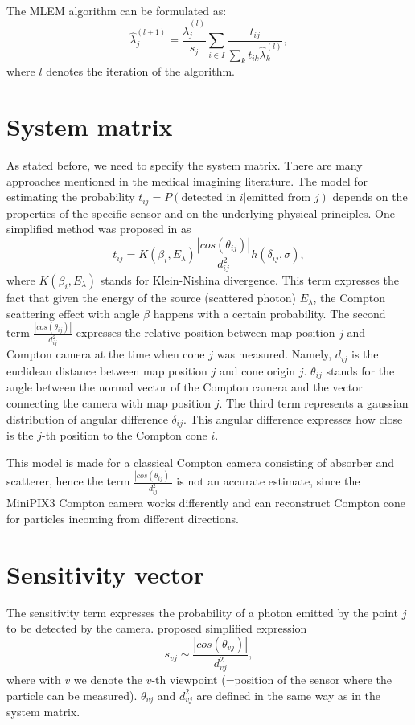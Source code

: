 The \ac{MLEM} algorithm can be formulated as:
\begin{equation}
\hat{\lambda}_{j}^{(l+1)} = \frac{\hat{\lambda}_{j}^{(l)}}{s_{j}} \sum_{i \in I} \frac{t_{ij}}{\sum_{k} t_{ik} \hat{\lambda}_{k}^{(l)}},
  \label{eq:MLEM}
\end{equation}
where $l$ denotes the iteration of the algorithm.

\section{System matrix}
As stated before, we need to specify the system matrix.
There are many approaches mentioned in the medical imagining literature.
The model for estimating the probability $t_{ij} = P(\textrm{detected in } i | \textrm{emitted from } j)$ depends on the properties of the specific sensor and on the underlying physical principles.
One simplified method was proposed in \cite{maxim2016} as
\begin{equation}
  t_{ij} = K(\beta_{i},E_{\lambda})   \frac{\left| cos(\theta_{ij}) \right|}{d^{2}_{ij}} h(\delta_{ij}, \sigma),
\end{equation}
where $K(\beta_{i},E_{\lambda})$ stands for Klein-Nishina divergence. 
This term expresses the fact that given the energy of the source (scattered photon) $E_{\lambda}$, the Compton scattering effect with angle $\beta$ happens with a certain probability. 
The second term  $\frac{\left| cos(\theta_{ij}) \right|}{d^{2}_{ij}}$ expresses the relative position between map position $j$ and Compton camera at the time when cone $j$ was measured.
Namely, $d_{ij}$ is the euclidean distance between map position $j$ and cone origin $j$.
$\theta_{ij}$ stands for the angle between the normal vector of the Compton camera and the vector connecting the camera with map position $j$. 
The third term represents a gaussian distribution of angular difference $\delta_{ij}$. 
This angular difference expresses how close is the $j$-th position to the Compton cone $i$.

This model is made for a classical Compton camera consisting of absorber and scatterer, hence the term $\frac{\left| cos(\theta_{ij}) \right|}{d^{2}_{ij}}$ is not an accurate estimate, since the MiniPIX3 Compton camera works differently and can reconstruct Compton cone for particles incoming from different directions.

\section{Sensitivity vector}
The sensitivity term expresses the probability of a photon emitted by the point $j$ to be detected by the camera. 
\cite{maxim2016} proposed simplified expression
\begin{equation}
  s_{vj} \sim \frac{\left| cos(\theta_{vj}) \right|}{d^{2}_{vj}},
\end{equation}
where with $v$ we denote the $v$-th viewpoint (=position of the sensor where the particle can be measured). $\theta_{vj}$ and $d^{2}_{vj}$ are defined in the same way as in the system matrix.

